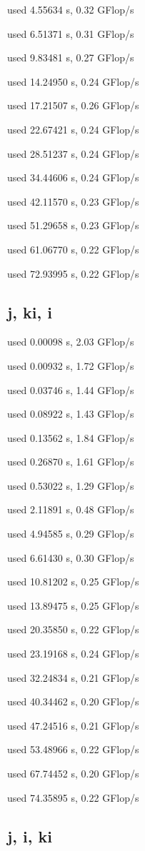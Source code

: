 \documentclass[12pt]{article}
\begin{document}
used 4.55634 s, 0.32 GFlop/s

used 6.51371 s, 0.31 GFlop/s

used 9.83481 s, 0.27 GFlop/s

used 14.24950 s, 0.24 GFlop/s

used 17.21507 s, 0.26 GFlop/s

used 22.67421 s, 0.24 GFlop/s

used 28.51237 s, 0.24 GFlop/s

used 34.44606 s, 0.24 GFlop/s

used 42.11570 s, 0.23 GFlop/s

used 51.29658 s, 0.23 GFlop/s

used 61.06770 s, 0.22 GFlop/s

used 72.93995 s, 0.22 GFlop/s

\subsection{j, ki, i}

used 0.00098 s, 2.03 GFlop/s

used 0.00932 s, 1.72 GFlop/s

used 0.03746 s, 1.44 GFlop/s

used 0.08922 s, 1.43 GFlop/s

used 0.13562 s, 1.84 GFlop/s

used 0.26870 s, 1.61 GFlop/s

used 0.53022 s, 1.29 GFlop/s

used 2.11891 s, 0.48 GFlop/s

used 4.94585 s, 0.29 GFlop/s

used 6.61430 s, 0.30 GFlop/s

used 10.81202 s, 0.25 GFlop/s

used 13.89475 s, 0.25 GFlop/s

used 20.35850 s, 0.22 GFlop/s

used 23.19168 s, 0.24 GFlop/s

used 32.24834 s, 0.21 GFlop/s

used 40.34462 s, 0.20 GFlop/s

used 47.24516 s, 0.21 GFlop/s

used 53.48966 s, 0.22 GFlop/s

used 67.74452 s, 0.20 GFlop/s

used 74.35895 s, 0.22 GFlop/s

\subsection{j, i, ki}
\end{document}
